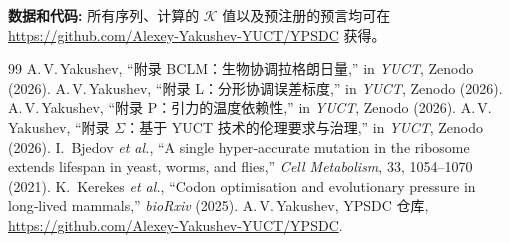 \documentclass[12pt,a4paper]{article}
\newcommand{\REL}{\mathcal{K}}          %
\begin{document}
	\vspace{0.5cm}
	\noindent\textbf{数据和代码:} 所有序列、计算的 \(\REL\) 值以及预注册的预言均可在 \url{https://github.com/Alexey-Yakushev-YUCT/YPSDC} 获得。
	
	\begin{thebibliography}{99}
		 A.\,V.\,Yakushev, ``附录 BCLM：生物协调拉格朗日量,'' in \emph{YUCT}, Zenodo (2026).
		 A.\,V.\,Yakushev, ``附录 L：分形协调误差标度,'' in \emph{YUCT}, Zenodo (2026).
		 A.\,V.\,Yakushev, ``附录 P：引力的温度依赖性,'' in \emph{YUCT}, Zenodo (2026).
		 A.\,V.\,Yakushev, ``附录 \(\Sigma\)：基于 YUCT 技术的伦理要求与治理,'' in \emph{YUCT}, Zenodo (2026).
		 I.~Bjedov \emph{et al.}, ``A single hyper‑accurate mutation in the ribosome extends lifespan in yeast, worms, and flies,'' \emph{Cell Metabolism}, 33, 1054–1070 (2021).
		 K.~Kerekes \emph{et al.}, ``Codon optimisation and evolutionary pressure in long‑lived mammals,'' \emph{bioRxiv} (2025).
		 A.\,V.\,Yakushev, YPSDC 仓库, \url{https://github.com/Alexey-Yakushev-YUCT/YPSDC}.
	\end{thebibliography}
	
\end{document}
